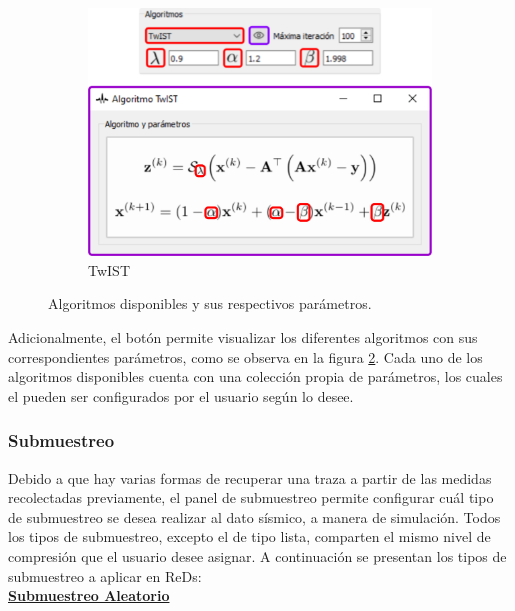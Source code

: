 \documentclass[12pt,twoside,letter]{ol-softwaremanual}
\newcommand*\circled[1]{\tikz[baseline=(char.base)]{
            \node[shape=circle,draw,inner sep=2pt] (char) {#1};}}
\begin{document}
\begin{figure}[!ht]
\begin{subfigure}[b]{0.47\textwidth}
         \includegraphics[width=\textwidth]{algorithm-twist.png}
         \caption{TwIST}
         \label{fig:twist}
     \end{subfigure}
        \caption{Algoritmos disponibles y sus respectivos parámetros.}
        \label{fig:algorithms}
\end{figure}

Adicionalmente, el botón\hspace{0.5mm} \faEye \hspace{0.5mm} permite visualizar los diferentes algoritmos con sus correspondientes parámetros, como se observa en la figura \ref{fig:algorithms}. Cada uno de los algoritmos disponibles cuenta con una colección propia de parámetros, los cuales el pueden ser configurados por el usuario según lo desee.

\subsubsection{Submuestreo}\label{subsampling}

Debido a que hay varias formas de recuperar una traza a partir de las medidas recolectadas previamente, el panel de submuestreo \circled{4} permite configurar cuál tipo de submuestreo se desea realizar al dato sísmico, a manera de simulación. Todos los tipos de submuestreo, excepto el de tipo lista, comparten el mismo nivel de compresión que el usuario desee asignar. A continuación se presentan los tipos de submuestreo a aplicar en ReDs:\\

\underline{\textbf{Submuestreo Aleatorio}}
\end{document}
